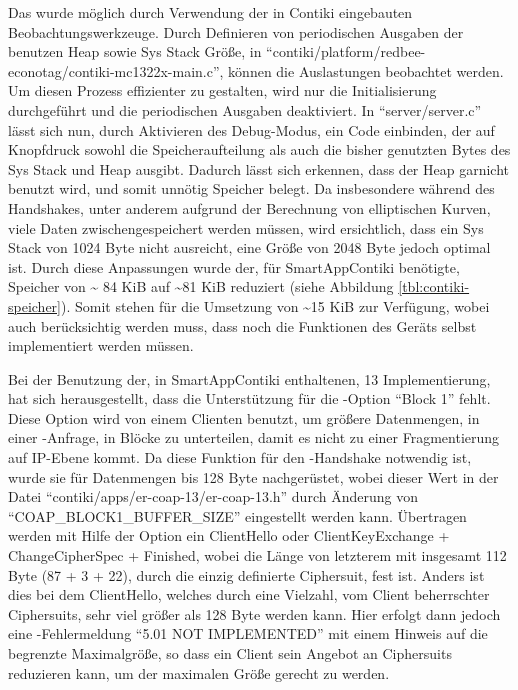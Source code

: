 Das wurde möglich durch Verwendung der in Contiki eingebauten Beobachtungswerkzeuge. Durch Definieren von periodischen Ausgaben der benutzen Heap
sowie Sys Stack Größe, in "`contiki/platform/redbee-econotag/contiki-mc1322x-main.c"', können die Auslastungen beobachtet werden. Um diesen Prozess
effizienter zu gestalten, wird nur die Initialisierung durchgeführt und die periodischen Ausgaben deaktiviert. In "`server/server.c"' lässt sich nun,
durch Aktivieren des Debug-Modus, ein Code einbinden, der auf Knopfdruck sowohl die Speicheraufteilung als auch die bisher genutzten Bytes des Sys Stack
und Heap ausgibt. Dadurch lässt sich erkennen, dass der Heap garnicht benutzt wird, und somit unnötig Speicher belegt. Da insbesondere während des Handshakes,
unter anderem aufgrund der Berechnung von elliptischen Kurven, viele Daten zwischengespeichert werden müssen, wird ersichtlich, dass ein Sys Stack von 1024
Byte nicht ausreicht, eine Größe von 2048 Byte jedoch optimal ist. Durch diese Anpassungen wurde der, für SmartAppContiki benötigte, Speicher von \textasciitilde
84 KiB auf \textasciitilde 81 KiB reduziert (siehe Abbildung \ref{tbl:contiki-speicher}). Somit stehen für die Umsetzung von  \textasciitilde 15 KiB zur
Verfügung, wobei auch berücksichtig werden muss, dass noch die Funktionen des Geräts selbst implementiert werden müssen.

Bei der Benutzung der, in SmartAppContiki enthaltenen,  13 Implementierung, hat sich herausgestellt, dass die Unterstützung für die -Option
"`Block 1"' fehlt. Diese Option wird von einem Clienten benutzt, um größere Datenmengen, in einer -Anfrage, in Blöcke zu unterteilen, damit es nicht
zu einer Fragmentierung auf IP-Ebene kommt. Da diese Funktion für den -Handshake notwendig ist, wurde sie für Datenmengen bis 128 Byte nachgerüstet,
wobei dieser Wert in der Datei "`contiki/apps/er-coap-13/er-coap-13.h"' durch Änderung von "`COAP\_BLOCK1\_BUFFER\_SIZE"' eingestellt werden kann. Übertragen
werden mit Hilfe der Option ein ClientHello oder ClientKeyExchange + ChangeCipherSpec + Finished, wobei die Länge von letzterem mit insgesamt 112 Byte
(87 + 3 + 22), durch die einzig definierte Ciphersuit, fest ist. Anders ist dies bei dem ClientHello, welches durch eine Vielzahl, vom Client beherrschter
Ciphersuits, sehr viel größer als 128 Byte werden kann. Hier erfolgt dann jedoch eine -Fehlermeldung "`5.01 NOT IMPLEMENTED"' mit einem
Hinweis auf die begrenzte Maximalgröße, so dass ein Client sein Angebot an Ciphersuits reduzieren kann, um der maximalen Größe gerecht zu werden.


